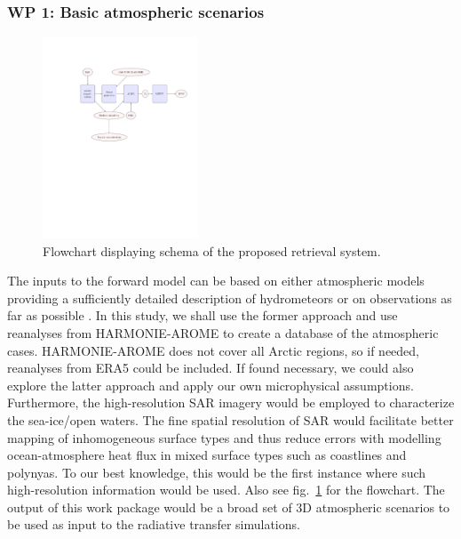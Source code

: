 \documentclass[12pt,oneside,a4paper]{article}
\begin{document}
\subsubsection*{WP 1: Basic atmospheric scenarios}
%
\begin{figure}[t]
	\centering
	\includegraphics[trim=140 370 40 125,clip,height = 60mm]{flowchart.pdf} 
	\caption{Flowchart displaying schema of the proposed retrieval system.}
	\label{fig:flowchart}
\end{figure}
\label{sec:emissivity}
The inputs to the forward model can be based on either atmospheric models providing a sufficiently detailed description of hydrometeors or on observations as far as possible \citep{ekelund:using:20}. In this study, we shall use the former approach and use reanalyses from HARMONIE-AROME to create a database of the atmospheric cases. HARMONIE-AROME does not cover all Arctic regions, so if needed, reanalyses from ERA5 could be included. If found necessary, we could also explore the latter approach and apply our own microphysical assumptions. Furthermore, the high-resolution SAR imagery would be employed to characterize the sea-ice/open waters. The fine spatial resolution of SAR would facilitate better mapping of inhomogeneous surface types and thus reduce errors with modelling ocean-atmosphere heat flux in mixed surface types such as coastlines and polynyas. To our best knowledge, this would be the first instance where such high-resolution information would be used. Also see fig.~\ref{fig:flowchart} for the flowchart.
The output of this work package would be a broad set of 3D atmospheric scenarios to be used as input to the radiative transfer simulations.
\end{document}
